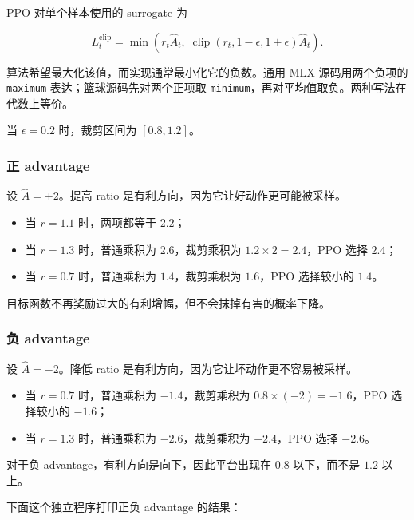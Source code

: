 \documentclass[
  chinese,
  11pt,
  letterpaper,
]{article}
\providecommand{\tightlist}{%
  \setlength{\itemsep}{0pt}\setlength{\parskip}{0pt}}
\begin{document}
PPO 对单个样本使用的 surrogate 为

\[
L_t^{\mathrm{clip}}
=
\min\left(
r_t\widehat A_t,\;
\operatorname{clip}(r_t,1-\epsilon,1+\epsilon)\widehat A_t
\right).
\]

算法希望最大化该值，而实现通常最小化它的负数。通用 MLX 源码用两个负项的
\texttt{maximum} 表达；篮球源码先对两个正项取
\texttt{minimum}，再对平均值取负。两种写法在代数上等价。

当 \(\epsilon=0.2\) 时，裁剪区间为 \([0.8,1.2]\)。

\subsubsection{正 advantage}\label{ux6b63-advantage}

设 \(\widehat A=+2\)。提高 ratio
是有利方向，因为它让好动作更可能被采样。

\begin{itemize}
\tightlist
\item
  当 \(r=1.1\) 时，两项都等于 \(2.2\)；
\item
  当 \(r=1.3\) 时，普通乘积为 \(2.6\)，裁剪乘积为
  \(1.2\times2=2.4\)，PPO 选择 \(2.4\)；
\item
  当 \(r=0.7\) 时，普通乘积为 \(1.4\)，裁剪乘积为 \(1.6\)，PPO
  选择较小的 \(1.4\)。
\end{itemize}

目标函数不再奖励过大的有利增幅，但不会抹掉有害的概率下降。

\subsubsection{负 advantage}\label{ux8d1f-advantage}

设 \(\widehat A=-2\)。降低 ratio
是有利方向，因为它让坏动作更不容易被采样。

\begin{itemize}
\tightlist
\item
  当 \(r=0.7\) 时，普通乘积为 \(-1.4\)，裁剪乘积为
  \(0.8\times(-2)=-1.6\)，PPO 选择较小的 \(-1.6\)；
\item
  当 \(r=1.3\) 时，普通乘积为 \(-2.6\)，裁剪乘积为 \(-2.4\)，PPO 选择
  \(-2.6\)。
\end{itemize}

对于负 advantage，有利方向是向下，因此平台出现在 \(0.8\) 以下，而不是
\(1.2\) 以上。

下面这个独立程序打印正负 advantage 的结果：
\end{document}
